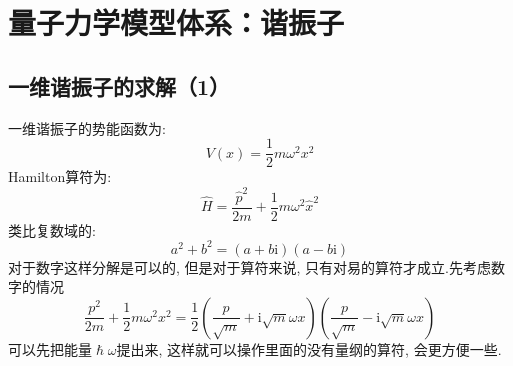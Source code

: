     \section{量子力学模型体系：谐振子}
    \subsection{一维谐振子的求解（1）}

        一维谐振子的势能函数为:
        \[ V(x) = \frac 12 m\omega^2x^2 \]
        Hamilton算符为:
        \[ \hat{H} = \frac {\hat{p}^2}{2m} + \frac 12 m\omega^2 \hat{x}^2 \]
        类比复数域的:
        \[ a^2 + b^2 = (a+b\mathrm{i})(a-b\mathrm{i}) \]
        对于数字这样分解是可以的, 但是对于算符来说, 只有对易的算符才成立.先考虑数字的情况
        \[ \frac {p^2}{2m} + \frac 12 m\omega^2 x^2 = \frac 12 (\frac p{\sqrt{m}} + \mathrm{i}\sqrt{m}\omega x)(\frac p{\sqrt{m}} - \mathrm{i}\sqrt{m}\omega x) \]
        可以先把能量$\hslash \omega$提出来, 这样就可以操作里面的没有量纲的算符, 会更方便一些.


